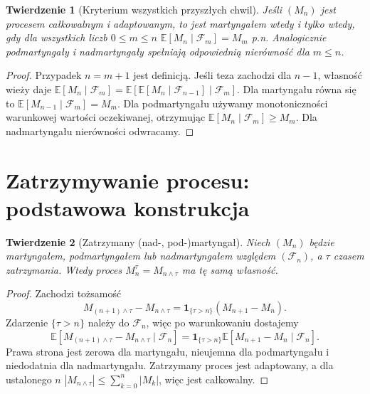 \documentclass[11pt,a4paper,oneside]{report}
\numberwithin{equation}{chapter}
\theoremstyle{plain}
\newtheorem{twierdzenie}{Twierdzenie}[chapter]
\theoremstyle{definition}
\theoremstyle{remark}
\newcommand{\E}{\mathbb{E}}
\newcommand{\ind}[1]{\mathbf{1}_{#1}}
\begin{document}
\begin{twierdzenie}[Kryterium wszystkich przyszłych chwil]
Jeśli $(M_n)$ jest procesem całkowalnym i
adaptowanym, to jest martyngałem wtedy i tylko wtedy,
gdy dla wszystkich liczb $0\leq m\leq n$
$\E[M_n\mid\mathcal F_m]=M_m$ p.n.
Analogicznie podmartyngały i nadmartyngały
spełniają odpowiednią nierówność dla $m\leq n$.
\end{twierdzenie}
\begin{proof}
Przypadek $n=m+1$ jest definicją. Jeśli teza
zachodzi dla $n-1$, własność wieży daje
$\E[M_n\mid\mathcal F_m]
=\E[\E[M_n\mid\mathcal F_{n-1}]\mid\mathcal F_m]$.
Dla martyngału równa się to
$\E[M_{n-1}\mid\mathcal F_m]=M_m$.
Dla podmartyngału używamy monotoniczności
warunkowej wartości oczekiwanej, otrzymując
$\E[M_n\mid\mathcal F_m]\geq M_m$.
Dla nadmartyngału nierówności odwracamy.
\end{proof}

\section{Zatrzymywanie procesu: podstawowa konstrukcja}

\begin{twierdzenie}[Zatrzymany (nad-, pod-)martyngał]
Niech $(M_n)$ będzie martyngałem, podmartyngałem
lub nadmartyngałem względem $(\mathcal F_n)$,
a $\tau$ czasem zatrzymania. Wtedy proces
$M_n^\tau=M_{n\wedge\tau}$ ma tę samą własność.
\end{twierdzenie}
\begin{proof}
Zachodzi tożsamość
\[
M_{(n+1)\wedge\tau}-M_{n\wedge\tau}
=\ind{\{\tau>n\}}(M_{n+1}-M_n).
\]
Zdarzenie $\{\tau>n\}$ należy do $\mathcal F_n$,
więc po warunkowaniu dostajemy
\[
\E[M_{(n+1)\wedge\tau}-M_{n\wedge\tau}
\mid\mathcal F_n]
=\ind{\{\tau>n\}}\E[M_{n+1}-M_n\mid\mathcal F_n].
\]
Prawa strona jest zerowa dla martyngału,
nieujemna dla podmartyngału i niedodatnia
dla nadmartyngału. Zatrzymany proces jest
adaptowany, a dla ustalonego $n$
$|M_{n\wedge\tau}|\leq\sum_{k=0}^n|M_k|$,
więc jest całkowalny.
\end{proof}
\end{document}
